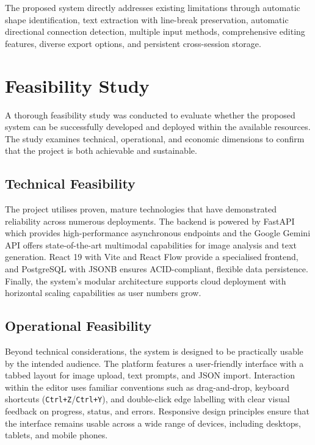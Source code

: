 The proposed system directly addresses existing limitations through automatic shape identification, text extraction with line-break preservation, automatic directional connection detection, multiple input methods, comprehensive editing features, diverse export options, and persistent cross-session storage.

\section{Feasibility Study}
\label{sec:feasibility}

A thorough feasibility study was conducted to evaluate whether the 
proposed system can be successfully developed and deployed within the 
available resources. The study examines technical, operational, and 
economic dimensions to confirm that the project is both achievable 
and sustainable.

\subsection{Technical Feasibility}
\label{sec:tech-feasibility}

The project utilises proven, mature technologies that have demonstrated reliability across numerous deployments. The backend is powered by FastAPI which provides high-performance asynchronous endpoints and the Google Gemini API offers state-of-the-art multimodal capabilities for image analysis and text generation. React 19 with Vite and React Flow provide a specialised frontend, and PostgreSQL with JSONB ensures ACID-compliant, flexible data persistence. Finally, the system’s modular architecture supports cloud deployment with horizontal scaling capabilities as user numbers grow.

\subsection{Operational Feasibility}
\label{sec:op-feasibility}

Beyond technical considerations, the system is designed to be practically usable by the intended audience. The platform features a user-friendly interface with a tabbed layout for image upload, text prompts, and JSON import. Interaction within the editor uses familiar conventions such as drag-and-drop, keyboard shortcuts (\texttt{Ctrl+Z}/\texttt{Ctrl+Y}), and double-click edge labelling with clear visual feedback on progress, status, and errors. Responsive design principles ensure that the interface remains usable across a wide range of devices, including desktops, tablets, and mobile phones.

